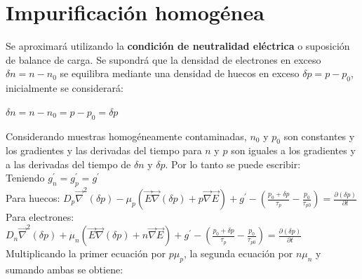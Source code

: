 \documentclass[oneside]{book}
\numberwithin{equation}{section}
\numberwithin{figure}{section}
\numberwithin{table}{section}
\begin{document}
		\section{Impurificación homogénea}
	
			Se aproximará utilizando la \textbf{condición de neutralidad eléctrica} o suposición de balance de carga. Se supondrá que la densidad de electrones en exceso $\delta n=n-n_0$ se equilibra mediante una densidad de huecos en exceso $\delta p=p-p_0$, inicialmente se considerará:\\
		
			\begin{center}
				 $\delta n=n-n_0=p-p_0=\delta p$
			\end{center}
		
			Considerando muestras homogéneamente contaminadas, $n_0$ y $p_0$ son constantes y los gradientes y las derivadas del tiempo para $n$ y $p$ son iguales a los gradientes y a las derivadas del tiempo de $\delta n$ y $\delta p$. Por lo tanto se puede escribir:\\
			
			Teniendo $g_n^\prime=g_p^\prime=g^\prime$\\
	
			Para huecos: $\displaystyle D_p\vec{\nabla}^2(\delta p)-\mu_p(\vec{E}\vec{\nabla} (\delta p)+p\vec{\nabla}\vec{E})+g^\prime-\left(\frac{p_0+\delta p}{\tau_p}-\frac{p_0}{\tau_{p0}}\right)=\frac{\partial (\delta p)}{\partial t}$\\

			Para electrones: $\displaystyle D_n\vec{\nabla}^2(\delta p)+\mu_n(\vec{E}\vec{\nabla}(\delta p)+n\vec{\nabla}\vec{E})+g^\prime-\left(\frac{p_0+\delta p}{\tau_p}-\frac{p_0}{\tau_{p0}}\right)=\frac{\partial (\delta p)}{\partial t}$\\
		
			Multiplicando la primer ecuación por $p\mu_p$, la segunda ecuación por $n\mu_n$ y sumando ambas se obtiene:\\
		
\end{document}
